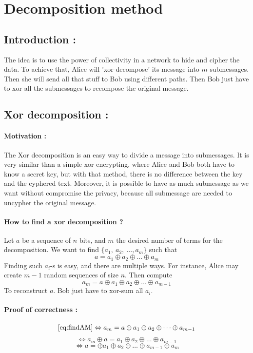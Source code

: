 \documentclass[a4paper, onecolumn, 10pt]{article}
\numberwithin{equation}{section}
\begin{document}
\section{Decomposition method}
\subsection{Introduction :} The idea is to use the power of collectivity in a network to hide and cipher the data. To achieve that, Alice will 'xor-decompose' its message into $m$ submessages. Then she will send all that stuff to Bob using different paths. Then Bob just have to xor all the submessages to recompose the original message. 
\subsection{Xor decomposition :}
\paragraph{Motivation :}
The Xor decomposition is an easy way to divide a message into submessages. It is very similar than a simple xor encrypting, where Alice and Bob both have to know a secret key, but with that method, there is no difference between the key and the cyphered text. Moreover, it is possible to have as much submessage as we want without compromise the privacy, because all submessage are needed to uncypher the original message.
\paragraph{How to find a xor decomposition ?}
Let $a$ be a sequence of $n$ bits, and $m$ the desired number of terms for the decomposition. We want to find $\{a_1,\ a_2,\ \dots, a_m\}$ such that 
\begin{equation} \label{eq:xorDecomposition}
  a=a_1\oplus a_2\oplus\dots\oplus a_m
\end{equation}
Finding such $a_i$-s is easy, and there are multiple ways. For instance, Alice may create $m-1$ random sequences of size $n$. Then compute 
\begin{equation} \label{eq:findAM}
  a_m = a\oplus a_1\oplus a_2\oplus\dots\oplus a_{m-1}
\end{equation}
To reconstruct $a$. Bob just have to xor-sum all $a_i$.
\paragraph{Proof of correctness :}
$$\eqref{eq:findAM} \Leftrightarrow a_m = a\oplus a_1\oplus a_2\oplus\dots\oplus a_{m-1}$$
$$\Leftrightarrow a_m\oplus a = a_1\oplus a_2\oplus\dots\oplus a_{m-1}$$
$$\Leftrightarrow a = \oplus a_1\oplus a_2\oplus\dots\oplus a_{m-1}\oplus a_m$$
\end{document}
